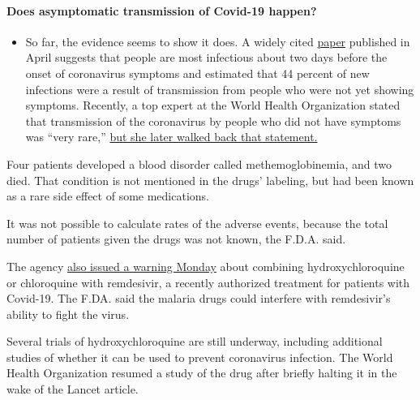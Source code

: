 \begin{itemize}
{  \paragraph{Does asymptomatic transmission of Covid-19
  happen?}\label{does-asymptomatic-transmission-of-covid-19-happen}}

  \begin{itemize}
  \tightlist
  \item
    So far, the evidence seems to show it does. A widely cited
    \href{https://www.nature.com/articles/s41591-020-0869-5}{paper}
    published in April suggests that people are most infectious about
    two days before the onset of coronavirus symptoms and estimated that
    44 percent of new infections were a result of transmission from
    people who were not yet showing symptoms. Recently, a top expert at
    the World Health Organization stated that transmission of the
    coronavirus by people who did not have symptoms was ``very rare,''
    \href{https://www.nytimes3xbfgragh.onion/2020/06/09/world/coronavirus-updates.html?action=click\&pgtype=Article\&state=default\&region=MAIN_CONTENT_3\&context=storylines_faq\#link-1f302e21}{but
    she later walked back that statement.}
  \end{itemize}
\end{itemize}

Four patients developed a blood disorder called methemoglobinemia, and
two died. That condition is not mentioned in the drugs' labeling, but
had been known as a rare side effect of some medications.

It was not possible to calculate rates of the adverse events, because
the total number of patients given the drugs was not known, the F.D.A.
said.

The agency
\href{https://www.fda.gov/media/137566/download?utm_campaign=FDA\%20Warns\%20of\%20Newly\%20Discovered\%20Potential\%20Drug\%20Interaction\%20That\%20May\%20Reduce\%20Effectiveness\&utm_medium=email\&utm_source=Eloqua}{also
issued a warning Monday} about combining hydroxychloroquine or
chloroquine with remdesivir, a recently authorized treatment for
patients with Covid-19. The F.DA. said the malaria drugs could interfere
with remdesivir's ability to fight the virus.

Several trials of hydroxychloroquine are still underway, including
additional studies of whether it can be used to prevent coronavirus
infection. The World Health Organization resumed a study of the drug
after briefly halting it in the wake of the Lancet article.

